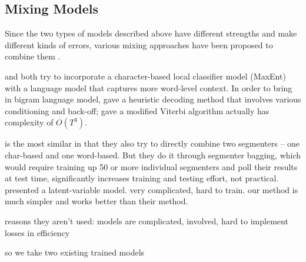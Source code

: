 \subsection{Mixing Models} Since the two types of models described above have different strengths and make different kinds of errors, various mixing approaches have been proposed to combine them \cite{Wang:2006:SIGHAN,Lin:2009:CICLing,Sun:2009:HLT-NAACL,Sun:2010:COLING,Wang:2010:COLING}. 


\cite{Lin:2009:CICLing} and \cite{Wang:2006:SIGHAN} both try to incorporate a character-based local classifier model (MaxEnt) with a language model that captures more word-level context.
In order to bring in bigram language model,   gave a heuristic decoding method that involves various conditioning and back-off;  gave a modified Viterbi algorithm actually has complexity of $O(T^3)$. 

\cite{Sun:2009:HLT-NAACL} is the most similar in that they also try to directly combine two segmenters -- one char-based and one word-based. But they do it through segmenter bagging, which would require training up 50 or more individual segmenters and poll their results at test time, significantly increases training and testing effort, not practical.
\cite{Sun:2009:HLT-NAACL} presented a latent-variable model. very complicated, hard to train. our method is much simpler and works better than their method.


reasons they aren't used:
	models are complicated, involved, hard to implement
	losses in efficiency
	
	
so we take two existing trained models 